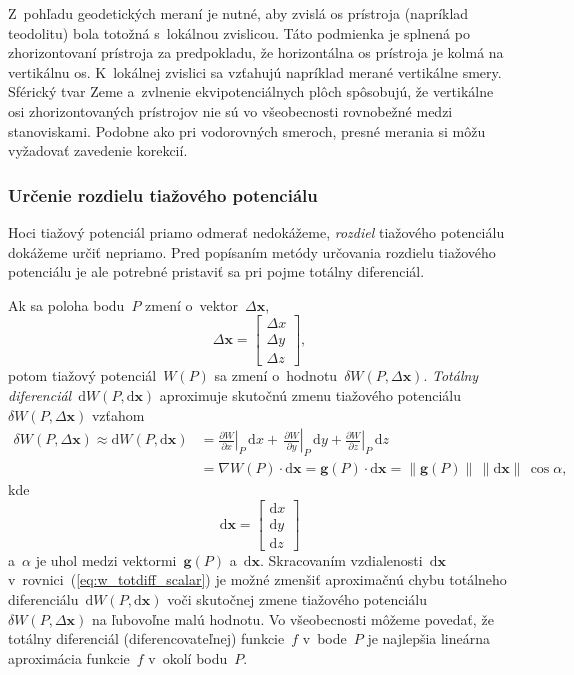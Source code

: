 \documentclass[a4paper,12pt]{book}
\newcommand{\diff}{\mathrm d}
\let\vec\mathbf
\begin{document}
Z~pohľadu geodetických meraní je nutné, aby zvislá os prístroja (napríklad
teodolitu) bola totožná s~lokálnou zvislicou.  Táto podmienka je splnená po
zhorizontovaní prístroja za predpokladu, že horizontálna os prístroja je kolmá
na vertikálnu os.  K~lokálnej zvislici sa vzťahujú napríklad merané
vertikálne smery.  Sférický tvar Zeme a~zvlnenie ekvipotenciálnych plôch
spôsobujú, že vertikálne osi zhorizontovaných prístrojov nie sú vo všeobecnosti
rovnobežné medzi stanoviskami.  Podobne ako pri vodorovných smeroch, presné
merania si môžu vyžadovať zavedenie korekcií.

\subsubsection{Určenie rozdielu tiažového potenciálu}
\label{sec:potential_differences}

Hoci tiažový potenciál priamo odmerať nedokážeme, \emph{rozdiel} tiažového 
potenciálu dokážeme určiť nepriamo.  Pred popísaním metódy určovania rozdielu 
tiažového potenciálu je ale potrebné pristaviť sa pri pojme totálny 
diferenciál.

Ak sa poloha bodu~$P$ zmení o~vektor~$\Delta \vec x$,
%
\begin{equation}
\label{eq:deltax}
\Delta \vec x =
\begin{bmatrix}
\Delta x\\
\Delta y\\
\Delta z
\end{bmatrix}
{,}
\end{equation}
%
potom tiažový potenciál~$W(P)$ sa zmení o~hodnotu~$\delta W(P, \Delta \vec x)$.  
\emph{Totálny diferenciál}~$\diff W(P, \diff \vec x)$ aproximuje skutočnú zmenu 
tiažového potenciálu~$\delta W(P, \Delta \vec x)$ vzťahom
%
\begin{equation}
\label{eq:w_totdiff_scalar}
\begin{split}
\delta W(P, \Delta \vec x) \approx \diff W(P, \diff \vec x) &= 
\left.\frac{\partial W}{\partial x}\right|_P \, \diff x + \, 
\left.\frac{\partial W}{\partial y}\right|_P \, \diff y + \left.\frac{\partial 
W}{\partial z}\right|_P \, \diff z\\
%
&= \nabla W(P) \cdot \diff \vec x = \vec g(P) \cdot \diff \vec x = \| \vec g(P) 
\| \, \| \diff \vec x \| \, \cos\alpha{,}
\end{split}
\end{equation}
%
kde
%
\begin{equation}
\label{eq:diffx}
\diff \vec x =
\begin{bmatrix}
\diff x\\
\diff y\\
\diff z
\end{bmatrix}
\end{equation}
%
a~$\alpha$ je uhol medzi vektormi~$\vec g(P)$ a~$\diff \vec x$.  Skracovaním 
vzdialenosti~$\diff \vec x$ v~rovnici~(\ref{eq:w_totdiff_scalar}) je možné 
zmenšiť aproximačnú chybu totálneho diferenciálu~$\diff W(P, \diff \vec x)$ 
voči skutočnej zmene tiažového potenciálu~$\delta W(P, \Delta \vec x)$ na 
ľubovoľne malú hodnotu.  Vo všeobecnosti môžeme povedať, že totálny diferenciál 
(diferencovateľnej) funkcie~$f$ v~bode~$P$ je najlepšia lineárna aproximácia 
funkcie~$f$ v~okolí bodu~$P$.
\end{document}
